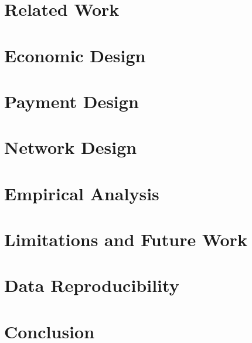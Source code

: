 \documentclass[USenglish,oneside,twocolumn]{article}
\begin{document}
\section{Related Work}
\label{sec:related_work}


\section{Economic Design}
\label{sec:economic}


\section{Payment Design}
\label{sec:payment}


\section{Network Design}
\label{sec:network}


\section{Empirical Analysis}
\label{sec:analysis}


\section{Limitations and Future Work}
\label{sec:limitations_futurework}


\section{Data Reproducibility}
\label{sec:code}


\section{Conclusion}
\label{sec:conclusion}






%
\appendix
\label{sec:algorithms}

\end{document}
